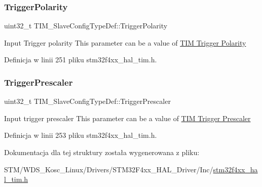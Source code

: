 \mbox{\label{struct_t_i_m___slave_config_type_def_afa8fa1801ef5e13115732a495ef11165}} 
\subsubsection{\texorpdfstring{Trigger\+Polarity}{TriggerPolarity}}
{\footnotesize\ttfamily uint32\+\_\+t T\+I\+M\+\_\+\+Slave\+Config\+Type\+Def\+::\+Trigger\+Polarity}

Input Trigger polarity This parameter can be a value of \hyperlink{group___t_i_m___trigger___polarity}{T\+IM Trigger Polarity} 

Definicja w linii 251 pliku stm32f4xx\+\_\+hal\+\_\+tim.\+h.

\mbox{\label{struct_t_i_m___slave_config_type_def_a57be6d41d77a968f1daeac7b65b1ab4c}} 
\subsubsection{\texorpdfstring{Trigger\+Prescaler}{TriggerPrescaler}}
{\footnotesize\ttfamily uint32\+\_\+t T\+I\+M\+\_\+\+Slave\+Config\+Type\+Def\+::\+Trigger\+Prescaler}

Input trigger prescaler This parameter can be a value of \hyperlink{group___t_i_m___trigger___prescaler}{T\+IM Trigger Prescaler} 

Definicja w linii 253 pliku stm32f4xx\+\_\+hal\+\_\+tim.\+h.



Dokumentacja dla tej struktury została wygenerowana z pliku\+:\begin{DoxyCompactItemize}
\item 
S\+T\+M/\+W\+D\+S\+\_\+\+Kosc\+\_\+\+Linux/\+Drivers/\+S\+T\+M32\+F4xx\+\_\+\+H\+A\+L\+\_\+\+Driver/\+Inc/\hyperlink{stm32f4xx__hal__tim_8h}{stm32f4xx\+\_\+hal\+\_\+tim.\+h}\end{DoxyCompactItemize}
